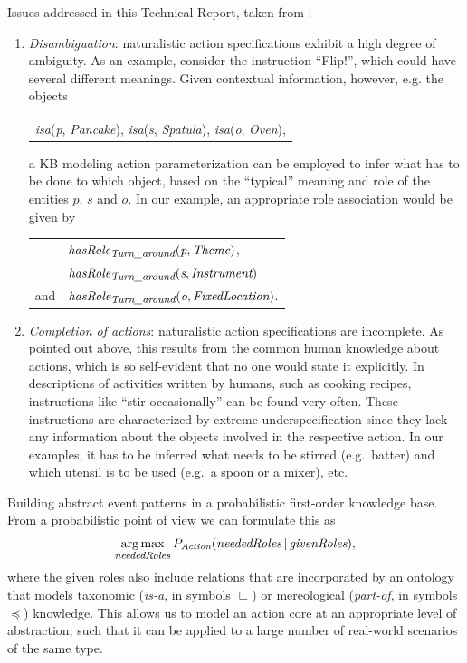 \documentclass[12pt,a4paper]{article}
\newcommand{\lsym}{\textit}
\DeclareMathOperator*{\argmax}{\text{arg\,max}}
\begin{document}
Issues addressed in this Technical Report, taken from \cite{nyga12actioncore}:
\begin{enumerate}
    \item \textit{Disambiguation}: naturalistic action 
    specifications exhibit a high degree of ambiguity. As an 
    example, consider the instruction ``Flip!'', which could 
    have several different meanings. Given contextual information, 
    however, e.g. the objects
	\begin{center}
	    \begin{tabular}{l}		
		\lsym{isa}(\lsym{p}, \lsym{Pancake}),
		\lsym{isa}(\lsym{s}, \lsym{Spatula}),
		\lsym{isa}(\lsym{o}, \lsym{Oven}),
	    \end{tabular}
	\end{center}
    a KB modeling action parameterization can be employed to infer 
    what has to be done to which object, based on the ``typical'' 
    meaning and role of the entities $p$, $s$ and $o$. In our example, an appropriate 
    role association would be given by
	
    \begin{center}
	    \begin{tabular}{ll}
		 & $ \lsym{hasRole}_{\lsym{\footnotesize Turn\_around}}(\lsym{p}, \lsym{Theme})$,\\
		 & $ \lsym{hasRole}_{\lsym{\footnotesize Turn\_around}}(\lsym{s}, \lsym{Instrument})$\\
		 and & $ \lsym{hasRole}_{\lsym{\footnotesize Turn\_around}}(\lsym{o}, \lsym{FixedLocation})$.
	    \end{tabular}
	\end{center}
	
    \item \textit{Completion of actions}: naturalistic action 
    specifications are incomplete. As pointed out above, this 
    results from the common human knowledge about actions, which is 
    so self-evident that no one would state it explicitly. In 
    descriptions of activities written by humans, such as cooking 
    recipes, instructions like ``stir occasionally'' can be found 
    very often. These instructions are characterized by extreme 
    underspecification since they lack any information about the 
    objects involved in the respective action. In our examples, it 
    has to be inferred what needs to be stirred (e.g.\ 
    batter) and which utensil is to be used (e.g.\ a spoon or a 
    mixer), etc.\ 
\end{enumerate}
Building abstract event patterns in a probabilistic 
first-order knowledge base. From a probabilistic 
point of view we can formulate this as \begin{eqnarray} \argmax_{
\mbox{\textit{{\footnotesize neededRoles}}}}P_{\textit {Action}}(
\textit{neededRoles}\,|\,\textit{givenRoles}),\nonumber 
\end{eqnarray} where the given roles also include relations that are 
incorporated by an ontology that models taxonomic (\textit {is-a}, 
in symbols $\sqsubseteq$) or mereological (\textit{part-of}, in 
symbols $\preceq$) knowledge. This allows us to model an action core 
at an appropriate level of abstraction, such that it can be applied 
to a large number of real-world scenarios of the same type.
\end{document}
